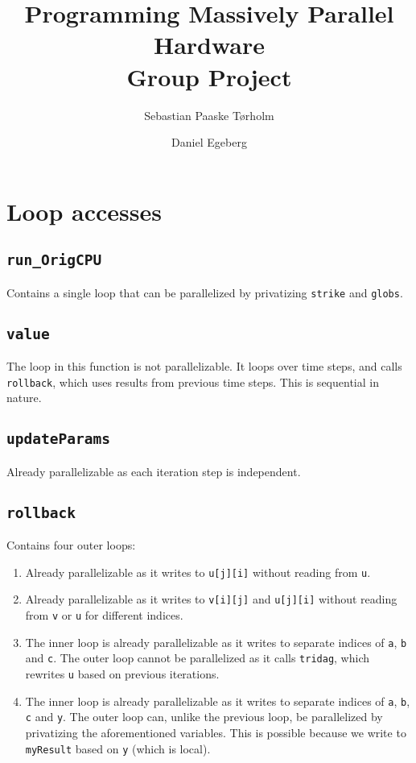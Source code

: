 \documentclass[a4paper]{article}
\title{Programming Massively Parallel Hardware \\ Group Project}
\author{Sebastian Paaske Tørholm \and Daniel Egeberg}
\begin{document}
\maketitle

\section{Loop accesses}
\label{sec:loop}

\subsection{\texttt{run\_OrigCPU}}

Contains a single loop that can be parallelized by privatizing \texttt{strike} and \texttt{globs}.

\subsection{\texttt{value}}

The loop in this function is not parallelizable. It loops over time steps, and
calls \texttt{rollback}, which uses results from previous time steps. This is
sequential in nature.

\subsection{\texttt{updateParams}}

Already parallelizable as each iteration step is independent.

\subsection{\texttt{rollback}}

Contains four outer loops:
\begin{enumerate}
    \item Already parallelizable as it writes to \texttt{u[j][i]} without reading from \texttt{u}.
    \item Already parallelizable as it writes to \texttt{v[i][j]} and \texttt{u[j][i]} without reading from \texttt{v} or \texttt{u} for different indices.
    \item The inner loop is already parallelizable as it writes to separate indices of \texttt{a}, \texttt{b} and \texttt{c}. The outer loop cannot be parallelized as it calls \texttt{tridag}, which rewrites \texttt{u} based on previous iterations.
    \item The inner loop is already parallelizable as it writes to separate indices of \texttt{a}, \texttt{b}, \texttt{c} and \texttt{y}. The outer loop can, unlike the previous loop, be parallelized by privatizing the aforementioned variables. This is possible because we write to \texttt{myResult} based on \texttt{y} (which is local).
\end{enumerate}
\end{document}
